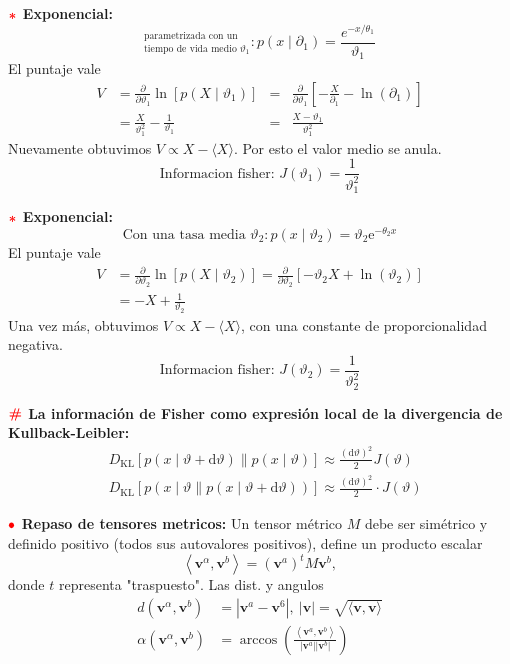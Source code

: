 \documentclass[%
 reprint,
 amsmath,amssymb,
 aps,
]{revtex4-1}
\begin{document}
\textbf{$\textcolor{red}{\color{red}{\boldsymbol{*}}}$ Exponencial:} 
$$
^\text{parametrizada con un} 
_{\text{tiempo de vida medio }\vartheta_{1}} : 
p\left(x \mid \partial_{1}\right)=\frac{e^{-x / \theta_{1}}}{\vartheta_{1}}
$$
El puntaje vale
$$
\begin{aligned}
V &=\frac{\partial}{\partial \vartheta_{1}} \ln \left[p\left(X \mid \vartheta_{1}\right)\right] &= &\frac{\partial}{\partial \vartheta_{1}}\left[-\frac{X}{\partial_{1}}-\ln \left(\partial_{1}\right)\right] \\
&=\frac{X}{\vartheta_{1}^{2}}-\frac{1}{\vartheta_{1}} &= &\frac{X-\vartheta_{1}}{\vartheta_{1}^{2}}
\end{aligned}
$$
Nuevamente obtuvimos $V \propto X-\langle X\rangle$. Por esto el valor medio se anula.
$$\text{Informacion fisher: }J\left(\vartheta_{1}\right)=\frac{1}{\vartheta_{1}^{2}}$$

\textbf{$\textcolor{red}{\color{red}{\boldsymbol{*}}}$ Exponencial:} 
$$
\text{Con una tasa media } \vartheta_{2} :
p\left(x \mid \vartheta_{2}\right)=\vartheta_{2} \mathrm{e}^{-\theta_{2} x}
$$
El puntaje vale
$$
\begin{aligned}
V &=\frac{\partial}{\partial \vartheta_{2}} \ln \left[p\left(X \mid \vartheta_{2}\right)\right] =\frac{\partial}{\partial \vartheta_{2}}\left[-\vartheta_{2} X+\ln \left(\vartheta_{2}\right)\right] \\
&=-X+\frac{1}{\vartheta_{2}}
\end{aligned}
$$
Una vez más, obtuvimos $V \propto X-\langle X\rangle$, con una constante de proporcionalidad negativa.
$$\text{Informacion fisher: }J\left(\vartheta_{2}\right)=\frac{1}{\vartheta_{2}^{2}}$$

\textbf{$\color{red}{\textbf{\#}}$ La información de Fisher como expresión local de la divergencia de Kullback-Leibler:}
$$
\begin{aligned}
  &D_{\mathrm{KL}}[p(x \mid \vartheta+\mathrm{d} \vartheta) \| p(x \mid \vartheta)] \approx  \frac{(\mathrm{d} \vartheta)^{2}}{2} J(\vartheta)\\
  &D_{\mathrm{KL}}[p(x \mid \vartheta \| p(x \mid \vartheta+\mathrm{d} \vartheta))] \approx \frac{(\mathrm{d} \vartheta)^{2}}{2} \cdot J(\vartheta)
\end{aligned}
$$

\textbf{$\color{red}{\bullet}$ Repaso de tensores metricos:} 
Un tensor métrico $M$ debe ser simétrico y definido positivo
(todos sus autovalores positivos), define un producto escalar
$$
\left\langle\boldsymbol{v}^{\alpha}, \boldsymbol{v}^{b}\right\rangle=\left(\boldsymbol{v}^{a}\right)^{t} M \boldsymbol{v}^{b},
$$
donde $t$ representa "traspuesto". Las dist. y angulos
$$
\begin{aligned}
d\left(\boldsymbol{v}^{\alpha}, \boldsymbol{v}^{b}\right) &=\left|\boldsymbol{v}^{a}-\boldsymbol{v}^{6}\right|, \ |\boldsymbol{v}| =\sqrt{\langle\boldsymbol{v}, \boldsymbol{v}\rangle} \\
\alpha\left(\boldsymbol{v}^{\alpha}, \boldsymbol{v}^{b}\right) &=\operatorname{arccos}\left(
  \frac{
    \left\langle
    \boldsymbol{v}^{a}, \boldsymbol{v}^{b}
    \right\rangle
    }{\left|\boldsymbol{v}^{a}\right|\left|\mathbf{v}^{b}\right|}
  \right)
\end{aligned}
$$
\end{document}
